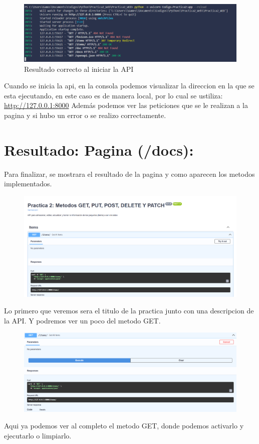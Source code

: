 \documentclass[12pt]{article}
\begin{document}
\begin{figure}[H]
    \centering
    \includegraphics[width=1\textwidth]{Imagenes/Captura_consola1.png}
    \caption{Resultado correcto al iniciar la API}
\end{figure}
Cuando se inicia la api, en la consola podemos visualizar la direccion en la que se esta ejecutando, en este caso es de manera local, por lo cual se ustiliza: \url{http://127.0.0.1:8000}
Además podemos ver las peticiones que se le realizan a la pagina y si hubo un error o se realizo correctamente.

\section{Resultado: Pagina (/docs):}
Para finalizar, se mostrara el resultado de la pagina y como aparecen los metodos implementados.

\begin{figure}[H]
    \centering
    \includegraphics[width=1\textwidth]{Imagenes/Inicio pagina.png}
\end{figure}
Lo primero que veremos sera el titulo de la practica junto con una descripcion de la API.
Y podremos ver un poco del metodo GET.

\begin{figure}[H]
    \centering
    \includegraphics[width=1\textwidth]{Imagenes/GET1.png}
\end{figure}
Aqui ya podemos ver al completo el metodo GET, donde podemos activarlo y ejecutarlo o limpiarlo.
\end{document}
